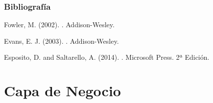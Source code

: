 \documentclass[handout,a4paper,slidestop,xcolor=pst,blue]{beamer}
\begin{document}
\begin{frame}[c]
    \frametitle{Bibliografía}
    \begin{thebibliography}{1}

        Fowler, M. (2002).
        .
        \newblock Addison-Wesley.

        Evans, E. J. (2003).
        .
        \newblock Addison-Wesley.

        Esposito, D. and Saltarello, A. (2014).
        .
        \newblock Microsoft Press. 2ª Edición.

    \end{thebibliography}
\end{frame}

\section{Capa de Negocio}
\end{document}
